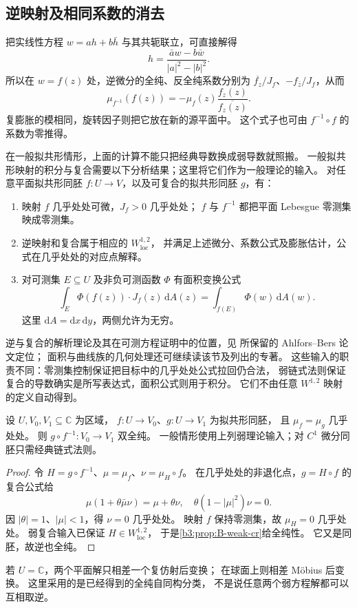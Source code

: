 \subsection{逆映射及相同系数的消去}
\label{b3:subsec:B0202}

把实线性方程 \(w=ah+b\bar h\) 与其共轭联立，可直接解得
\[
 h=\frac{\bar a w-b\bar w}{|a|^2-|b|^2}.
\]
所以在 \(w=f(z)\) 处，逆微分的全纯、反全纯系数分别为
\(\overline{f_z}/J_f\)、\(-f_{\bar z}/J_f\)，从而
\[
 \mu_{f^{-1}}(f(z))
 =-\mu_f(z)\frac{f_z(z)}{\overline{f_z(z)}}.
\]
复膨胀的模相同，旋转因子则把它放在新的源平面中。
这个式子也可由 \(f^{-1}\circ f\) 的系数为零推得。

\ProseParagraphBreak

在一般拟共形情形，上面的计算不能只把经典导数换成弱导数就照搬。
一般拟共形映射的积分与复合需要以下分析结果；这里将它们作为一般理论的输入。
对任意平面拟共形同胚 \(f:U\rightarrow V\)，以及可复合的拟共形同胚 \(g\)，有：
\begin{enumerate}
\item\label{b3:item:B-weak-input-1}
映射 \(f\) 几乎处处可微，\(J_f>0\) 几乎处处；
\(f\) 与 \(f^{-1}\) 都把平面 Lebesgue 零测集映成零测集。
\item\label{b3:item:B-weak-input-2}
逆映射和复合属于相应的 \(W^{1,2}_{\mathrm{loc}}\)，
并满足上述微分、系数公式及膨胀估计，公式在几乎处处的对应点解释。
\item\label{b3:item:B-weak-input-3}
对可测集 \(E\subseteq U\) 及非负可测函数 \(\Phi\) 有面积变换公式
\[
 \int_E\Phi(f(z))\cdot J_f(z)\,\mathrm dA(z)
 =\int_{f(E)}\Phi(w)\,\mathrm dA(w).
\]
这里 \(\mathrm dA=\mathrm dx\,\mathrm dy\)，两侧允许为无穷。
\end{enumerate}
逆与复合的解析理论及其在可测方程证明中的位置，见
所保留的 Ahlfors--Bers 论文定位；
面积与曲线族的几何处理还可继续读该节及列出的专著。
这些输入的职责不同：零测集控制保证把目标中的几乎处处公式拉回仍合法，
弱链式法则保证复合的导数确实是所写表达式，面积公式则用于积分。
它们不由任意 \(W^{1,2}\) 映射的定义自动得到。

\begin{proposition}[相同复膨胀的坐标转换]\label{b3:prop:B-same-coefficient}
设 \(U,V_0,V_1\subseteq\mathbb C\) 为区域，
\(f:U\rightarrow V_0\)、\(g:U\rightarrow V_1\) 为拟共形同胚，
且 \(\mu_f=\mu_g\) 几乎处处。
则 \(g\circ f^{-1}:V_0\rightarrow V_1\) 双全纯。
一般情形使用上列弱理论输入；对 \(C^1\) 微分同胚只需经典链式法则。
\end{proposition}
\begin{proof}
令 \(H=g\circ f^{-1}\)、\(\mu=\mu_f\)、\(\nu=\mu_H\circ f\)。
在几乎处处的非退化点，\(g=H\circ f\) 的复合公式给
\[
 \mu(1+\theta\bar\mu\nu)=\mu+\theta\nu,
 \quad \theta(1-|\mu|^2)\nu=0.
\]
因 \(|\theta|=1\)、\(|\mu|<1\)，得 \(\nu=0\) 几乎处处。
映射 \(f\) 保持零测集，故 \(\mu_H=0\) 几乎处处。
弱复合输入已保证 \(H\in W^{1,2}_{\mathrm{loc}}\)，
于是\cref{b3:prop:B-weak-cr}给全纯性。
它又是同胚，故逆也全纯。
\end{proof}
若 \(U=\mathbb C\)，两个平面解只相差一个复仿射后变换；
在球面上则相差 Möbius 后变换。
这里采用的是已经得到的全纯自同构分类，
不是说任意两个弱方程解都可以互相取逆。

